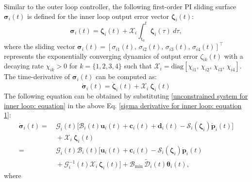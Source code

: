 \documentclass[lettersize,journal]{IEEEtran}
\begin{document}
Similar to the outer loop controller, the following first-order PI sliding surface $\boldsymbol{\sigma}_i(t)$ is defined for the inner loop output error vector $\boldsymbol{\zeta}_i(t)$:
\begin{equation} \label{sigma for inner loop: equation}
    \boldsymbol{\sigma}_i(t) = \boldsymbol{\zeta}_i(t) + \mathcal{X}_i \int_{\text{t}_0}^t \boldsymbol{\zeta}_i(\tau)~d\tau,
\end{equation}
where the sliding vector $\boldsymbol{\sigma}_i(t)  = [\sigma_{i 1}(t),\, \sigma_{i 2}(t),\, \sigma_{i 3}(t),\, \sigma_{i 4}(t)]^{\top}$ represents the exponentially converging dynamics of output error $\zeta_{i k}(t)$ with a decaying rate $\chi_{i k} > 0$ for $k = \{1, 2, 3, 4\}$ such that $\mathcal{X}_i = \text{diag}[\chi_{i 1},\, \chi_{i 2},\, \chi_{i 3},\, \chi_{i 4}]$.
The time-derivative of $\boldsymbol{\sigma}_i(t)$ can be computed as:
\begin{equation} \label{sigma derivative for inner loop: equation 1}
    \dot{\boldsymbol{\sigma}}_i(t) = \dot{\boldsymbol{\zeta}}_i(t) + \mathcal{X}_i~\boldsymbol{\zeta}_i(t)
\end{equation}
The following equation can be obtained by substituting  \eqref{unconstrained system for inner loop: equation} in the above Eq. \eqref{sigma derivative for inner loop: equation 1}:
\begin{align}
    \label{sigma derivative for inner loop: equation 2}
    \dot{\boldsymbol{\sigma}}_i(t) =& ~\mathcal{G}_i(t) \big[\mathcal{B}_i(t) \boldsymbol{u}_i(t) + \boldsymbol{c}_i(t) + \boldsymbol{d}_i(t) - \mathcal{S}_i(\boldsymbol{\zeta}_i) \dot{\boldsymbol{p}}_i(t) \big] \nonumber \\
    &~ + \mathcal{X}_i~\boldsymbol{\zeta}_i(t) \nonumber \\
    = &~ \mathcal{G}_i(t) \mathcal{B}_i(t) \big[\boldsymbol{u}_i(t) +  \boldsymbol{c}_i(t) - \mathcal{S}_i(\boldsymbol{\zeta}_i) \dot{\boldsymbol{p}}_i(t) \nonumber \\ 
    & ~ + \mathcal{G}_i^{-1}(t) \mathcal{X}_i\,\boldsymbol{\zeta}_i(t) \big] + \mathcal{B}_{\text{min}} \, \tilde{\mathcal{D}}_i(t) \boldsymbol{\theta}_i(t), 
\end{align}
where 
\end{document}
